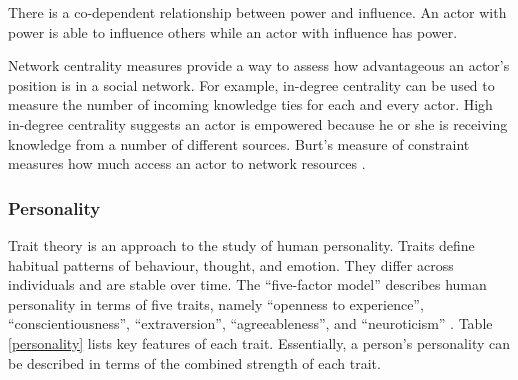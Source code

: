 There is a co-dependent relationship between power and influence. An actor with power is able to influence others while an actor with influence has power. 

Network centrality measures provide a way to assess how advantageous an actor's position is in a social network. For example, in-degree centrality can be used to measure the number of incoming knowledge ties for each and every actor. High in-degree centrality suggests an actor is empowered because he or she is receiving knowledge from a number of different sources. Burt's measure of constraint measures how much access an actor to network resources \citep{burt1987social}. 




\subsubsection{Personality}

Trait theory is an approach to the study of human personality. Traits define habitual patterns of behaviour, thought, and emotion. They differ across individuals and are stable over time. The \enquote{five-factor model} describes human personality in terms of five traits, namely \enquote{openness to experience}, \enquote{conscientiousness}, \enquote{extraversion}, \enquote{agreeableness}, and \enquote{neuroticism} \citep{mccrae1992introduction}. Table \ref{personality} lists key features of each trait. Essentially, a person's personality can be described in terms of the combined strength of each trait. \medskip 

